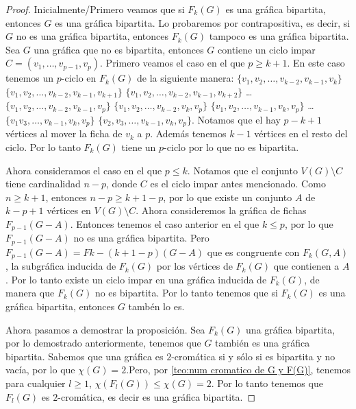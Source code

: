 \begin{proof}
    Inicialmente/Primero veamos que si $F_k(G)$ es una gr\'afica bipartita,
    entonces $G$ es una gr\'afica bipartita. Lo probaremos por contrapositiva,
    es decir, si $G$ no es una gr\'afica bipartita, entonces $F_k(G)$ tampoco es
    una gr\'afica bipartita. Sea $G$ una gr\'afica que no es bipartita, entonces
    $G$ contiene un ciclo impar $C=(v_1, \dots, v_{p-1}, v_p)$. Primero veamos
    el caso en el que $p \geq k+1$. En este caso tenemos un $p$-ciclo en
    $F_k(G)$ de la siguiente manera: $\{v_1, v_2, \dots, v_{k-2}, v_{k-1},
    v_k\}$ $\{v_1, v_2, \dots, v_{k-2}, v_{k-1}, v_{k+1}\}$ $\{v_1, v_2, \dots,
    v_{k-2}, v_{k-1}, v_{k+2}\}$ \dots $\{v_1, v_2, \dots, v_{k-2}, v_{k-1},
    v_p\}$ $\{v_1, v_2, \dots, v_{k-2}, v_k, v_p\}$ $\{v_1, v_2, \dots, v_{k-1},
    v_k, v_p\}$ \dots $\{v_1 v_3, \dots, v_{k-1}, v_k, v_p\}$ $\{v_2, v_3,
    \dots, v_{k-1}, v_k, v_p\}$. Notamos que el hay $p-k+1$ v\'ertices al mover
    la ficha de $v_k$ a $p$. Adem\'as tenemos $k-1$ v\'ertices en el resto del
    ciclo. Por lo tanto $F_k(G)$ tiene un $p$-ciclo por lo que no es bipartita.
    
    Ahora consideramos el caso en el que $p \leq k$. Notamos que el conjunto
    $V(G)\setminus C$ tiene cardinalidad $n-p$, donde $C$ es el ciclo impar
    antes mencionado. Como $n \geq k+1$, entonces $n-p \geq k+1-p$, por lo que
    existe un conjunto $A$ de $k-p+1$ v\'ertices en $V(G)\setminus C$. Ahora
    consideremos la gr\'afica de fichas $F_{p-1}(G-A)$. Entonces tenemos el caso
    anterior en el que $k \leq p$, por lo que $F_{p-1}(G-A)$ no es una gr\'afica
    bipartita. Pero $F_{p-1}(G-A)=F{k-(k+1-p)}(G-A)$ que es congruente con $
    F_k(G,A)$, la subgr\'afica inducida de $F_k(G)$ por los v\'ertices de
    $F_k(G)$ que contienen a $A$. Por lo tanto existe un ciclo impar en una
    gr\'afica inducida de $F_k(G)$, de manera que $F_k(G)$ no es bipartita. Por
    lo tanto tenemos que si $F_k(G)$ es una gr\'afica bipartita, entonces $G$
    tamb\'en lo es.
    

    Ahora pasamos a demostrar la proposici\'on. Sea $F_k(G)$ una gr\'afica
    bipartita, por lo demostrado anteriormente, tenemos que $G$ tambi\'en es una
    gr\'afica bipartita. Sabemos que una gr\'afica es $2$-crom\'atica si y
    s\'olo si es bipartita y no vac\'ia, por lo que $\chi(G)=2$.Pero, por
    \cref{teo:num cromatico de G y F(G)}, tenemos para cualquier $l\geq 1$,
    $\chi (F_l(G)) \le \chi (G)=2$. Por lo tanto tenemos que $F_l(G)$ es
    $2$-crom\'atica, es decir es una gr\'afica bipartita.
\end{proof}

